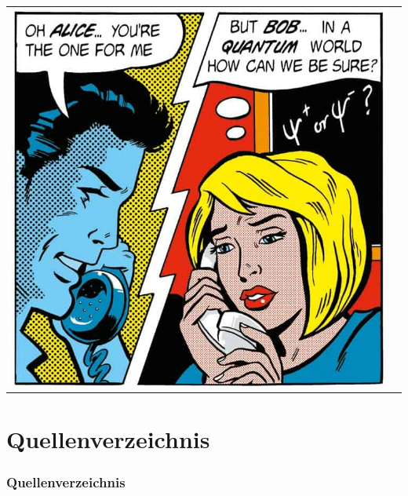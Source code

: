 \documentclass[11pt]{beamer}
\begin{document}
	\begin{frame}
		\maketitle
	\end{frame}
	
	\begin{frame}
		\begin{tabular}{cc}
			\includegraphics[scale=0.25]{figures/Communication-without-particles-pic1} &  \\
		\end{tabular}
	\end{frame}
	
	
	
%	
	
	
	

	\section{Quellenverzeichnis}
	\begin{frame}[allowframebreaks]
		\frametitle{Quellenverzeichnis}
		
		
	\end{frame}
	
\end{document}
